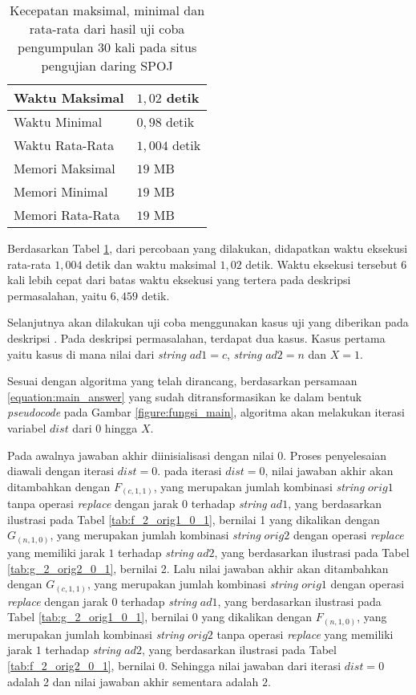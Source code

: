 \begin{table}
	\centering
	\begin{tabular}{|l|l|} \hline
		Waktu Maksimal & $ 1,02 $ detik\\ \hline
		Waktu Minimal & $ 0,98 $ detik\\ \hline
		Waktu Rata-Rata & $ 1,004 $ detik\\ \hline
		Memori Maksimal & $ 19 $ MB\\ \hline
		Memori Minimal & $ 19 $ MB\\ \hline
		Memori Rata-Rata & $ 19 $ MB\\ \hline
	\end{tabular}
	\caption{Kecepatan maksimal, minimal dan rata-rata dari hasil uji coba pengumpulan 30 kali pada situs pengujian daring SPOJ}
	\label{tab:statistik}
\end{table}

Berdasarkan Tabel \ref{tab:statistik}, dari percobaan yang dilakukan,  didapatkan waktu eksekusi rata-rata $ 1,004 $ detik dan waktu maksimal $ 1,02 $ detik. Waktu eksekusi tersebut 6 kali lebih cepat dari batas waktu eksekusi yang tertera pada deskripsi permasalahan, yaitu $ 6,459 $ detik.

Selanjutnya akan dilakukan uji coba menggunakan kasus uji yang diberikan pada deskripsi \problem{}. Pada deskripsi permasalahan, terdapat dua kasus. Kasus pertama yaitu kasus di mana nilai dari \textit{string} $ ad1=c $, \textit{string} $ ad2=n $ dan $ X = 1 $.

Sesuai dengan algoritma yang telah dirancang, berdasarkan persamaan \ref{equation:main_answer} yang sudah ditransformasikan ke dalam bentuk \textit{pseudocode} pada Gambar \ref{figure:fungsi_main}, algoritma akan melakukan iterasi variabel $ dist $ dari $ 0 $ hingga $ X $.


Pada awalnya jawaban akhir diinisialisasi dengan nilai $ 0 $. Proses penyelesaian diawali dengan iterasi $ dist=0 $. pada iterasi $ dist = 0 $, nilai jawaban akhir akan ditambahkan dengan $ F_{(c, 1,1)} $, yang merupakan jumlah kombinasi \textit{string} $ orig1 $ tanpa operasi \textit{replace} dengan jarak $ 0 $ terhadap \textit{string} $ ad1 $, yang berdasarkan ilustrasi pada Tabel \ref{tab:f_2_orig1_0_1}, bernilai 1 yang dikalikan dengan $ G_{(n, 1,0)} $, yang merupakan jumlah kombinasi \textit{string} $ orig2 $ dengan operasi \textit{replace} yang memiliki jarak $ 1 $ terhadap \textit{string} $ ad2 $, yang berdasarkan ilustrasi pada Tabel \ref{tab:g_2_orig2_0_1}, bernilai 2. Lalu nilai jawaban akhir akan ditambahkan dengan $ G_{(c, 1,1)} $, yang merupakan jumlah kombinasi \textit{string} $ orig1 $ dengan operasi \textit{replace} dengan jarak $ 0 $ terhadap \textit{string} $ ad1 $, yang berdasarkan ilustrasi pada Tabel \ref{tab:g_2_orig1_0_1}, bernilai 0 yang dikalikan dengan $ F_{(n, 1,0)} $, yang merupakan jumlah kombinasi \textit{string} $ orig2 $ tanpa operasi \textit{replace} yang memiliki jarak $ 1 $ terhadap \textit{string} $ ad2 $, yang berdasarkan ilustrasi pada Tabel \ref{tab:f_2_orig2_0_1}, bernilai 0. Sehingga nilai jawaban dari iterasi $ dist=0 $ adalah 2 dan nilai jawaban akhir sementara adalah $ 2 $.

